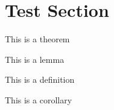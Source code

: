 \documentclass{article}
\begin{document}
\section{Test Section}
\begin{theorem} This is a theorem \end{theorem}
\begin{lemma} This is a lemma \end{lemma}
\begin{definition} This is a definition \end{definition}
\begin{corollary} This is a corollary \end{corollary}
\end{document}
